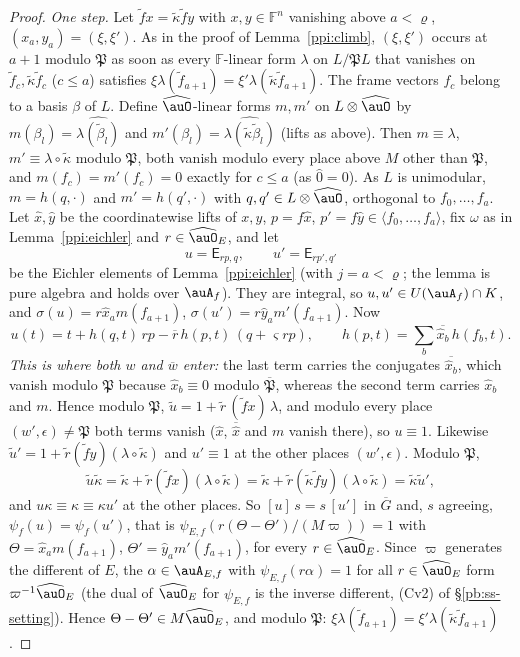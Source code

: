 \documentclass[10pt]{amsart}
\theoremstyle{definition}
\theoremstyle{remark}
\providecommand{\auG}{\overline G}
\providecommand{\aubar}[1]{\overline{#1}}
\begin{document}
\begin{proof}
\emph{One step.} Let $\tilde f x=\tilde\kappa\tilde f y$ with $x,y\in\mathbb F^n$ vanishing above $a<\varrho$,
$(x_a,y_a)=(\xi,\xi')$. As in the proof of Lemma~\ref{ppi:climb}, $(\xi,\xi')$ occurs at $a+1$ modulo
$\mathfrak P$ as soon as every $\mathbb F$-linear form $\lambda$ on $L/\mathfrak PL$ that vanishes on
$\tilde f_c,\tilde\kappa\tilde f_c$ ($c\le a$) satisfies $\xi\lambda(\tilde f_{a+1})=\xi'\lambda(\tilde\kappa\tilde f_{a+1})$.
The frame vectors $f_c$ belong to a basis $\beta$ of $L$. Define $\widehat\auO$-linear forms $m,m'$ on
$L\otimes\widehat\auO$ by $m(\beta_l)=\widehat{\lambda(\tilde\beta_l)}$ and $m'(\beta_l)=\widehat{\lambda(\tilde
\kappa\tilde\beta_l)}$ (lifts as above). Then $m\equiv\lambda$, $m'\equiv\lambda\circ\tilde\kappa$ modulo $\mathfrak P$,
both vanish modulo every place above $M$ other than $\mathfrak P$, and $m(f_c)=m'(f_c)=0$ exactly for
$c\le a$ (as $\hat0=0$). As $L$ is unimodular, $m=h(q,\cdot)$ and $m'=h(q',\cdot)$ with $q,q'\in L\otimes
\widehat\auO$, orthogonal to $f_0,\dots,f_a$. Let $\hat x,\hat y$ be the coordinatewise lifts of $x,y$,
$p=f\hat x$, $p'=f\hat y\in\langle f_0,\dots,f_a\rangle$, fix $\omega$ as in Lemma~\ref{ppi:eichler} and
$r\in\widehat\auO_E$, and let
\[
u=\mathsf E_{rp,q},\qquad u'=\mathsf E_{rp',q'}
\]
be the Eichler elements of Lemma~\ref{ppi:eichler} (with $j=a<\varrho$; the lemma is pure algebra and
holds over $\auA_f$). They are integral, so $u,u'\in U(\auA_f)\cap K$, and $\sigma(u)=r\hat x_am(f_{a+1})$,
$\sigma(u')=r\hat y_am'(f_{a+1})$. Now
\[
u(t)=t+h(q,t)\,rp-\aubar r\,h(p,t)\,(q+\varsigma rp),\qquad h(p,t)=\textstyle\sum_b\aubar{\hat x_b}\,h(f_b,t).
\]
\emph{This is where both $w$ and $\aubar w$ enter:} the last term carries the conjugates
$\aubar{\hat x_b}$, which vanish modulo $\mathfrak P$ because $\hat x_b\equiv0$ modulo $\aubar{\mathfrak
P}$, whereas the second term carries $\hat x_b$ and $m$. Hence modulo $\mathfrak P$, $\tilde u=1+\tilde r
\,(\tilde fx)\,\lambda$, and modulo every place $(w',\epsilon)\ne\mathfrak P$ both terms vanish ($\hat x$,
$\aubar{\hat x}$ and $m$ vanish there), so $u\equiv1$. Likewise $\tilde u'=1+\tilde r(\tilde fy)(\lambda\circ
\tilde\kappa)$ and $u'\equiv1$ at the other places $(w',\epsilon)$. Modulo $\mathfrak P$,
\[
\tilde u\tilde\kappa=\tilde\kappa+\tilde r(\tilde fx)(\lambda\circ\tilde\kappa)=\tilde\kappa+\tilde r(\tilde\kappa\tilde fy)(\lambda\circ\tilde\kappa)=
\tilde\kappa\tilde u' ,
\]
and $u\kappa\equiv \kappa\equiv \kappa u'$ at the other places. So $[u]\,s=s\,[u']$ in $\auG$ and, $s$ agreeing, $\psi_f(u)=
\psi_f(u')$, that is $\psi_{E,f}(r(\Theta-\Theta')/(M\varpi))=1$ with $\Theta=\hat x_am(f_{a+1})$,
$\Theta'=\hat y_am'(f_{a+1})$, for every $r\in\widehat\auO_E$. Since $\varpi$ generates the different of
$E$, the $\alpha\in\auA_{E,f}$ with $\psi_{E,f}(r\alpha)=1$ for all $r\in\widehat\auO_E$ form $\varpi^{-1}
\widehat\auO_E$ (the dual of $\widehat\auO_E$ for $\psi_{E,f}$ is the inverse different, (Cv2) of \S\ref{pb:ss-setting}). Hence $\Theta-\Theta'\in
M\widehat\auO_E$, and modulo $\mathfrak P$: $\xi\lambda(\tilde f_{a+1})=\xi'\lambda(\tilde\kappa\tilde f_{a+1})$.


\end{proof}
\end{document}
